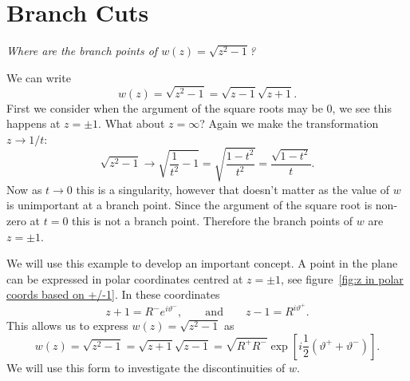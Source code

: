 \documentclass{article}
\begin{document}
    \section{Branch Cuts}
    \begin{example}
        \textit{Where are the branch points of \(w(z) = \sqrt{z^2 - 1}\)?}
        
        We can write
        \[w(z) = \sqrt{z^2 - 1} = \sqrt{z - 1}\sqrt{z + 1}.\]
        First we consider when the argument of the square roots may be \(0\), we see this happens at \(z = \pm 1\).
        What about \(z = \infty\)?
        Again we make the transformation \(z \to 1/t\):
        \[\sqrt{z^2 - 1} \to \sqrt{\frac{1}{t^2} - 1} = \sqrt{\frac{1 - t^2}{t^2}} = \frac{\sqrt{1 - t^2}}{t}.\]
        Now as \(t \to 0\) this is a singularity, however that doesn't matter as the value of \(w\) is unimportant at a branch point.
        Since the argument of the square root is non-zero at \(t = 0\) this is not a branch point.
        Therefore the branch points of \(w\) are \(z = \pm 1\).
    \end{example}
    We will use this example to develop an important concept.
    A point in the plane can be expressed in polar coordinates centred at \(z = \pm 1\), see figure~\ref{fig:z in polar coords based on +/-1}.
    In these coordinates
    \[z + 1 = R^- e^{i\vartheta^-}, \qquad\text{and}\qquad z - 1 = R^{i\vartheta^+}.\]
    This allows us to express \(w(z) = \sqrt{z^2 - 1}\) as
    \[w(z) = \sqrt{z^2 - 1} = \sqrt{z + 1}\sqrt{z - 1} = \sqrt{R^+R^-}\exp\left[i\frac{1}{2}(\vartheta^+ + \vartheta^-)\right].\]
    We will use this form to investigate the discontinuities of \(w\).
\end{document}
